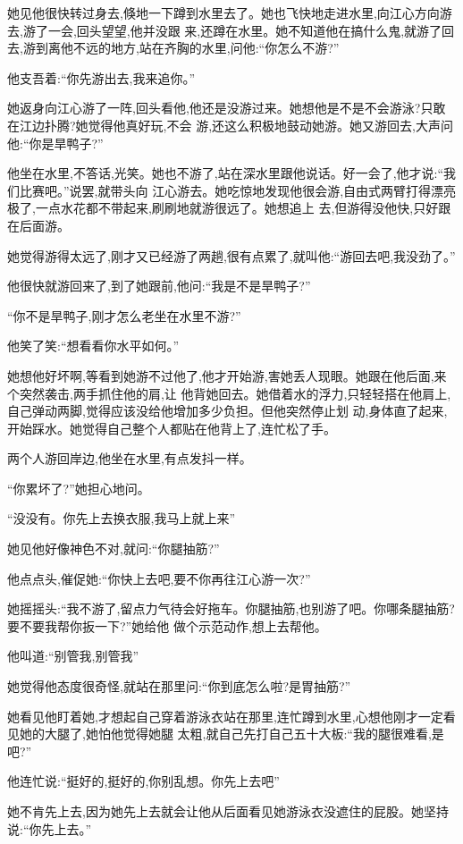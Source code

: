 ﻿\documentclass[12pt]{article}
\begin{document}
她见他很快转过身去,倏地一下蹲到水里去了。她也飞快地走进水里,向江心方向游去,游了一会,回头望望,他并没跟
来,还蹲在水里。她不知道他在搞什么鬼,就游了回去,游到离他不远的地方,站在齐胸的水里,问他:``你怎么不游?''

他支吾着:``你先游出去,我来追你。''

她返身向江心游了一阵,回头看他,他还是没游过来。她想他是不是不会游泳?只敢在江边扑腾?她觉得他真好玩,不会
游,还这么积极地鼓动她游。她又游回去,大声问他:``你是旱鸭子?''


他坐在水里,不答话,光笑。她也不游了,站在深水里跟他说话。好一会了,他才说:``我们比赛吧。''说罢,就带头向
江心游去。她吃惊地发现他很会游,自由式两臂打得漂亮极了,一点水花都不带起来,刷刷地就游很远了。她想追上
去,但游得没他快,只好跟在后面游。

她觉得游得太远了,刚才又已经游了两趟,很有点累了,就叫他:``游回去吧,我没劲了。''

他很快就游回来了,到了她跟前,他问:``我是不是旱鸭子?''

``你不是旱鸭子,刚才怎么老坐在水里不游?''

他笑了笑:``想看看你水平如何。''

她想他好坏啊,等看到她游不过他了,他才开始游,害她丢人现眼。她跟在他后面,来个突然袭击,两手抓住他的肩,让
他背她回去。她借着水的浮力,只轻轻搭在他肩上,自己弹动两脚,觉得应该没给他增加多少负担。但他突然停止划
动,身体直了起来,开始踩水。她觉得自己整个人都贴在他背上了,连忙松了手。

两个人游回岸边,他坐在水里,有点发抖一样。

``你\myrule 累坏了?''她担心地问。

``没\myrule 没有。你先上去换衣服,我马上就上来\myrule ''

她见他好像神色不对,就问:``你\myrule 腿抽筋?''

他点点头,催促她:``你快上去吧,要不\myrule 你再往江心游一次?''

她摇摇头:``我不游了,留点力气待会好拖车。你腿抽筋,也别游了吧。你哪条腿抽筋?要不要我帮你扳一下?''她给他
做个示范动作,想上去帮他。

他叫道:``别管我,别管我\myrule ''

她觉得他态度很奇怪,就站在那里问:``你到底怎么啦?是胃抽筋?''

她看见他盯着她,才想起自己穿着游泳衣站在那里,连忙蹲到水里,心想他刚才一定看见她的大腿了,她怕他觉得她腿
太粗,就自己先打自己五十大板:``我的腿很难看,是吧?''

他连忙说:``挺好的,挺好的,你别乱想。你\myrule 先上去吧\myrule ''

她不肯先上去,因为她先上去就会让他从后面看见她游泳衣没遮住的屁股。她坚持说:``你先上去。''
\end{document}
